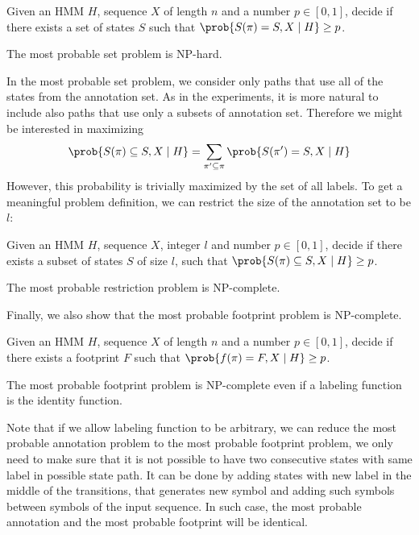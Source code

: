 \begin{definition} Given an HMM $H$, sequence $X$ of
length $n$ and a number $p\in [0,1]$, decide if there exists a set of states $S$
such that $\prob{S(\pi) = S, X\mid H} \geq p$.
\end{definition}

\begin{theorem}
The most probable set problem is NP-hard. \label{THEOREM::NPSET}
\end{theorem}

In the most probable set problem, we consider only paths that use all
of the states from the annotation set. As in the experiments, it is more natural to 
include also paths that use only a subsets of annotation set. Therefore we
might be interested in maximizing 
\[
\prob{S(\pi) \subseteq S, X\mid H} = \sum_{\pi'\subseteq\pi}\prob{S(\pi') = S, X\mid H}
\]
However, this probability is trivially maximized by the set of all labels. To
get a meaningful problem definition, we can restrict the size of the annotation
set to be $l$:

\begin{definition}
Given an HMM $H$, sequence $X$, integer $l$ and number $p\in[0,1]$, decide if
there exists a subset of states $S$ of size $l$, such that
$\prob{S(\pi)\subseteq S, X\mid H} \geq p$.
\end{definition}

\begin{theorem}
The most probable restriction problem is NP-complete. \label{THEOREM::NPREST}
\end{theorem}

Finally, we also show that the most probable footprint problem is NP-complete.
\begin{definition}
Given an HMM $H$, sequence $X$
of length $n$ and a number $p\in [0,1]$, decide if there exists a footprint $F$
such that $\prob{f(\pi) = F, X\mid H}\geq p$.
\end{definition}

\begin{theorem}
The most probable footprint problem is NP-complete even if a labeling function is the identity function.
\label{THEOREM::NPFOOT}
\end{theorem}
Note that if we allow labeling function to be arbitrary, we can reduce the most
probable annotation problem to the most probable footprint problem, we only
need to make sure that it is not possible to have two consecutive states with
same label in possible state path. It can be done by adding states with new
label in the middle of the transitions, that generates new symbol and adding
such symbols between symbols of the input sequence. In such case, the most
probable annotation and the most probable footprint will be identical.

